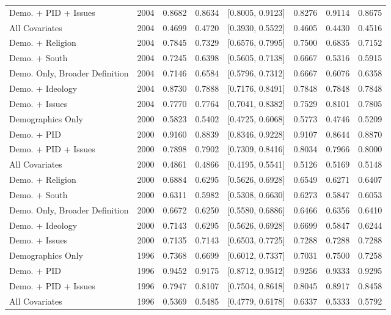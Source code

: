 \begin{longtable}{lrrrlrrr}
  Demo. + PID + Issues & 2004 & 0.8682 & 0.8634 & [0.8005, 0.9123] & 0.8276 & 0.9114 & 0.8675 \\ 
  All Covariates & 2004 & 0.4699 & 0.4720 & [0.3930, 0.5522] & 0.4605 & 0.4430 & 0.4516 \\ 
  Demo. + Religion & 2004 & 0.7845 & 0.7329 & [0.6576, 0.7995] & 0.7500 & 0.6835 & 0.7152 \\ 
  Demo. + South & 2004 & 0.7245 & 0.6398 & [0.5605, 0.7138] & 0.6667 & 0.5316 & 0.5915 \\ 
  Demo. Only, Broader Definition & 2004 & 0.7146 & 0.6584 & [0.5796, 0.7312] & 0.6667 & 0.6076 & 0.6358 \\ 
  Demo. + Ideology & 2004 & 0.8730 & 0.7888 & [0.7176, 0.8491] & 0.7848 & 0.7848 & 0.7848 \\ 
  Demo. + Issues & 2004 & 0.7770 & 0.7764 & [0.7041, 0.8382] & 0.7529 & 0.8101 & 0.7805 \\ 
  Demographics Only & 2000 & 0.5823 & 0.5402 & [0.4725, 0.6068] & 0.5773 & 0.4746 & 0.5209 \\ 
  Demo. + PID & 2000 & 0.9160 & 0.8839 & [0.8346, 0.9228] & 0.9107 & 0.8644 & 0.8870 \\ 
  Demo. + PID + Issues & 2000 & 0.7898 & 0.7902 & [0.7309, 0.8416] & 0.8034 & 0.7966 & 0.8000 \\ 
  All Covariates & 2000 & 0.4861 & 0.4866 & [0.4195, 0.5541] & 0.5126 & 0.5169 & 0.5148 \\ 
  Demo. + Religion & 2000 & 0.6884 & 0.6295 & [0.5626, 0.6928] & 0.6549 & 0.6271 & 0.6407 \\ 
  Demo. + South & 2000 & 0.6311 & 0.5982 & [0.5308, 0.6630] & 0.6273 & 0.5847 & 0.6053 \\ 
  Demo. Only, Broader Definition & 2000 & 0.6672 & 0.6250 & [0.5580, 0.6886] & 0.6466 & 0.6356 & 0.6410 \\ 
  Demo. + Ideology & 2000 & 0.7143 & 0.6295 & [0.5626, 0.6928] & 0.6699 & 0.5847 & 0.6244 \\ 
  Demo. + Issues & 2000 & 0.7135 & 0.7143 & [0.6503, 0.7725] & 0.7288 & 0.7288 & 0.7288 \\ 
  Demographics Only & 1996 & 0.7368 & 0.6699 & [0.6012, 0.7337] & 0.7031 & 0.7500 & 0.7258 \\ 
  Demo. + PID & 1996 & 0.9452 & 0.9175 & [0.8712, 0.9512] & 0.9256 & 0.9333 & 0.9295 \\ 
  Demo. + PID + Issues & 1996 & 0.7947 & 0.8107 & [0.7504, 0.8618] & 0.8045 & 0.8917 & 0.8458 \\ 
  All Covariates & 1996 & 0.5369 & 0.5485 & [0.4779, 0.6178] & 0.6337 & 0.5333 & 0.5792 \\ 

\end{longtable}
